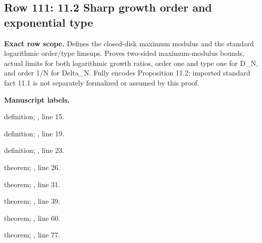 \subsection{Row 111: 11.2 Sharp growth order and exponential type}
\label{row:111}
\textbf{Exact row scope.} Defines the closed-disk maximum modulus and the standard logarithmic order/type limsups. Proves two-sided maximum-modulus bounds, actual limits for both logarithmic growth ratios, order one and type one for D\_N, and order 1/N for Delta\_N. Fully encodes Proposition 11.2; imported standard fact 11.1 is not separately formalized or assumed by this proof.\par\smallskip
\textbf{Manuscript labels.} \par\smallskip
{\small{}\par}
{\footnotesize\color{muted}definition; , line 15.\par}\smallskip
{\small{}\par}
{\footnotesize\color{muted}definition; , line 19.\par}\smallskip
{\small{}\par}
{\footnotesize\color{muted}definition; , line 23.\par}\smallskip
{\small{}\par}
{\footnotesize\color{muted}theorem; , line 26.\par}\smallskip
{\small{}\par}
{\footnotesize\color{muted}theorem; , line 31.\par}\smallskip
{\small{}\par}
{\footnotesize\color{muted}theorem; , line 39.\par}\smallskip
{\small{}\par}
{\footnotesize\color{muted}theorem; , line 60.\par}\smallskip
{\small{}\par}
{\footnotesize\color{muted}theorem; , line 77.\par}\smallskip
